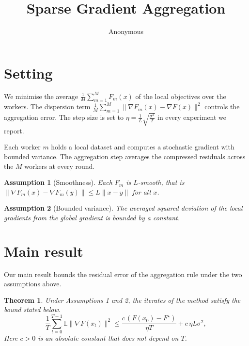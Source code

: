 \documentclass[10pt,twocolumn]{article}
\title{Sparse Gradient Aggregation}
\author{Anonymous}
\date{}
\newtheorem{assumption}{Assumption}
\newtheorem{theorem}{Theorem}
\newcommand{\s}[1]{#1}
\newcommand{\m}[2]{#1}
\begin{document}
\maketitle

\section{Setting}
We minimise the average $\frac{1}{M}\sum_{m=1}^{M} F_m(x)$ of the local objectives over the workers.
The dispersion term $\frac{1}{M}\sum_{m=1}^{M}\|\nabla F_m(x) - \nabla F(x)\|^2$ controls the aggregation error.
The step size is set to $\eta = \frac{1}{L}\sqrt{\frac{\sigma^2}{T}}$ in every experiment we report.

\s{Each worker \m{$m$}{m} holds a local dataset and computes a stochastic gradient with bounded variance.}
\s{The aggregation step averages the compressed residuals across the \m{$M$}{M} workers at every round.}

\begin{assumption}[Smoothness]
\s{Each \m{$F_m$}{Fm} is \m{$L$}{L}-smooth, that is \m{$\|\nabla F_m(x) - \nabla F_m(y)\| \le L\|x-y\|$}{∥∇Fm(x) − ∇Fm(y)∥ ≤ L∥x − y∥} for all \m{$x$}{x}.}
\end{assumption}

\begin{assumption}[Bounded variance]
\s{The averaged squared deviation of the local gradients from the global gradient is bounded by a constant.}
\end{assumption}

\section{Main result}
\s{Our main result bounds the residual error of the aggregation rule under the two assumptions above.}

\begin{theorem}
\s{Under Assumptions 1 and 2, the iterates of the method satisfy the bound stated below.}
\begin{equation}
\frac{1}{T}\sum_{t=0}^{T-1}\mathbb{E}\|\nabla F(x_t)\|^2 \le \frac{c\,(F(x_0)-F^\star)}{\eta T} + c\,\eta L \sigma^2 ,
\end{equation}
\s{Here \m{$c > 0$}{c > 0} is an absolute constant that does not depend on \m{$T$}{T}.}
\end{theorem}
\end{document}
